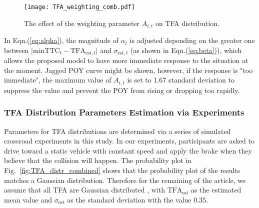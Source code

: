 \begin{figure}[htbp!]
\begin{center}
\texttt{[image: TFA\_weighting\_comb.pdf]}
\end{center}
\caption{The effect of the weighting parameter $A_{i,t}$ on TFA distribution.}
\label{fig:TFA_weighting_comb} 
\end{figure}




In Eqn.(\ref{eq:alpha}), the magnitude of $\alpha_t$ is adjusted depending on the greater one between $\lvert {\mathrm{min TTC}}_{t} - \mathrm{TFA}_{\mathrm{est}, t} \rvert $ and $ \sigma_{\mathrm{est}, t}$ (as shown in Eqn.(\ref{eq:beta})), which allows the proposed model to have more immediate response to the situation at the moment. Jagged POY curve might be shown, however, if the response is "too immediate", the maximum value of $A_{i,t}$ is set to 1.67 standard deviation to suppress the value and prevent the POY from rising or dropping too rapidly.


\subsubsection{TFA Distribution Parameters Estimation via Experiments}

Parameters for TFA distributions are determined via a series of simulated crossroad experiments in this study. In our experiments, participants are asked to drive toward a static vehicle with constant speed and apply the brake when they believe that the collision will happen. The probability plot in Fig.~\ref{fig:TFA_distr_combined} shows that the probability plot of the results matches a Gaussian distribution.  Therefore for the remaining of the article, we assume that all TFA are Gaussian distributed , with ${\mathrm{TFA}}_{\mathrm{est}}$ as the estimated mean value and $\sigma_{\mathrm{est}}$ as the standard deviation with the value 0.35. 
  

